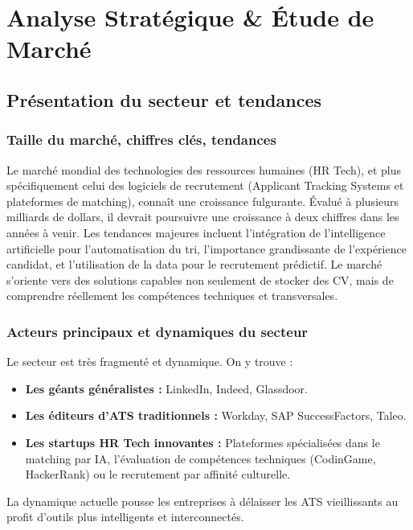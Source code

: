 \documentclass[12pt,a4paper]{report}
\begin{document}
\chapter{Analyse Stratégique \& Étude de Marché}

\section{Présentation du secteur et tendances}

\subsection{Taille du marché, chiffres clés, tendances}
Le marché mondial des technologies des ressources humaines (HR Tech), et plus spécifiquement celui des logiciels de recrutement (Applicant Tracking Systems et plateformes de matching), connaît une croissance fulgurante. Évalué à plusieurs milliards de dollars, il devrait poursuivre une croissance à deux chiffres dans les années à venir. Les tendances majeures incluent l'intégration de l'intelligence artificielle pour l'automatisation du tri, l'importance grandissante de l'expérience candidat, et l'utilisation de la data pour le recrutement prédictif. Le marché s'oriente vers des solutions capables non seulement de stocker des CV, mais de comprendre réellement les compétences techniques et transversales.

\subsection{Acteurs principaux et dynamiques du secteur}
Le secteur est très fragmenté et dynamique. On y trouve :
\begin{itemize}
    \item \textbf{Les géants généralistes :} LinkedIn, Indeed, Glassdoor.
    \item \textbf{Les éditeurs d'ATS traditionnels :} Workday, SAP SuccessFactors, Taleo.
    \item \textbf{Les startups HR Tech innovantes :} Plateformes spécialisées dans le matching par IA, l'évaluation de compétences techniques (CodinGame, HackerRank) ou le recrutement par affinité culturelle.
\end{itemize}
La dynamique actuelle pousse les entreprises à délaisser les ATS vieillissants au profit d'outils plus intelligents et interconnectés.
\end{document}
